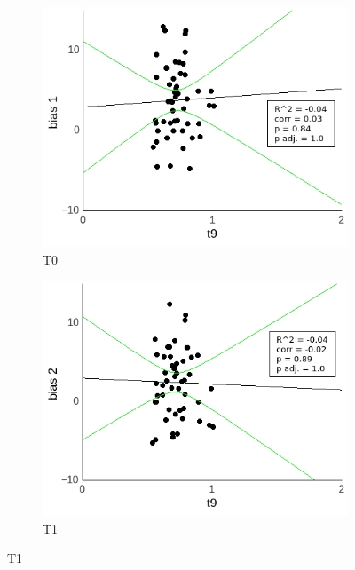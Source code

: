 \documentclass[a4paper]{scrreprt}
\begin{document}
\begin{figure}
\centering
\begin{subfigure}[b]{0.49\textwidth}
        \includegraphics[width=\textwidth]{figs/sec3/t9/t9no_diff_1_mod2mod2.jpeg}
        \caption{T0}
    \end{subfigure}
    \begin{subfigure}[b]{0.49\textwidth}
        \includegraphics[width=\textwidth]{figs/sec3/t9/t9no_diff_2_mod2mod2.jpeg}
        \caption{T1}
    \end{subfigure}


\end{figure}
\end{document}
